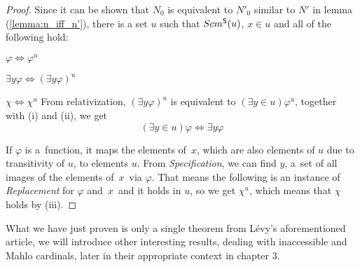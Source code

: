 \begin{proof}
Since it can be shown that $N_0$ is equivalent to $N'_0$ similar to $N'$ in lemma (\ref{lemma:n_iff_n'}), 
there is a set $u$ such that $Scm^{\sf{S}}(u)$, $x \in u$ and all of the following hold:
\bce[(i)]
\item $\varphi \iff \varphi^{u}$
\item $\exists y \varphi \iff (\exists y \varphi)^{u}$
\item $\chi \iff \chi^{u}$
\ece
From relativization, $(\exists y \varphi)^{u}$ is equivalent to $(\exists y \in u) \varphi^{u}$, together with (i) and (ii), we get
\begin{equation}
(\exists y \in u)\varphi \iff \exists y \varphi
\end{equation}

If $\varphi$ is a~function, %
it maps the elements of~$x$, which are also elements of $u$ due to transitivity of $u$, to elements $u$. From \emph{Specification}, we can find $y$, a~set of all images of the elements of~$x$~via $\varphi$. That means the following is an instance of \emph{Replacement} for $\varphi$ and~$x$~and it holds in $u$, so we get $\chi^{u}$, which means that $\chi$ holds by (iii).
\end{proof} %

What we have just proven is only a single theorem from Lévy's aforementioned article, we will introduce other interesting results, dealing with inaccessible and Mahlo cardinals, later in their appropriate context in chapter 3. %

